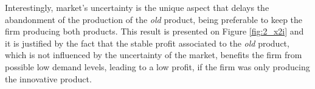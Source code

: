 

Interestingly, market's uncertainty is the unique aspect that delays the abandonment of the production of the \textit{old} product, being preferable to keep the firm producing both products. This result is presented on Figure \ref{fig:2_x2i} and it is justified by the fact that the stable profit associated to the \textit{old} product, which is not influenced by the uncertainty of the market, benefits the firm from possible low demand levels, leading to a low profit, if the firm was only producing the innovative product.

